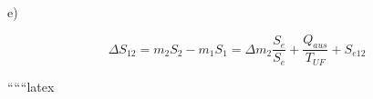 e)

\[
\Delta S_{12} = m_2 S_2 - m_1 S_1 = \Delta m_2 \frac{S_e}{S_e} + \frac{Q_{aus}}{T_{UF}} + S_{e12}
\]

``````latex